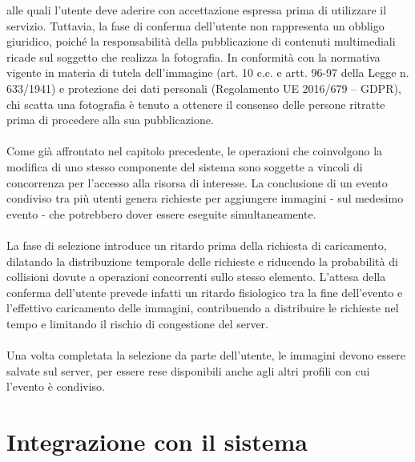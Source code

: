 alle quali l'utente deve aderire con accettazione espressa prima di utilizzare il servizio. 
Tuttavia, la fase di conferma dell'utente non rappresenta un obbligo giuridico, 
poiché la responsabilità della pubblicazione di contenuti multimediali 
ricade sul soggetto che realizza la fotografia. 
In conformità con la normativa vigente in materia di tutela dell'immagine 
(art. 10 c.c. e artt. 96-97 della Legge n. 633/1941) e protezione dei dati personali (Regolamento UE 2016/679 – GDPR), 
chi scatta una fotografia è tenuto a ottenere il consenso delle persone ritratte 
prima di procedere alla sua pubblicazione.\\
\\
Come già affrontato nel capitolo precedente, 
le operazioni che coinvolgono la modifica di uno stesso componente del sistema 
sono soggette a vincoli di concorrenza per l'accesso alla risorsa di interesse. 
La conclusione di un evento condiviso tra più utenti 
genera richieste per aggiungere immagini - sul medesimo evento -
che potrebbero dover essere eseguite simultaneamente.\\
\\
La fase di selezione introduce un ritardo prima della richiesta di caricamento, 
dilatando la distribuzione temporale delle richieste e
riducendo la probabilità di collisioni 
dovute a operazioni concorrenti sullo stesso elemento.
L'attesa della conferma dell'utente prevede infatti un ritardo fisiologico 
tra la fine dell'evento e l'effettivo caricamento delle immagini, 
contribuendo a distribuire le richieste nel tempo e 
limitando il rischio di congestione del server.\\
\\
Una volta completata la selezione da parte dell'utente, 
le immagini devono essere salvate sul server, 
per essere rese disponibili anche agli altri profili con cui l'evento è condiviso.

\section{Integrazione con il sistema}

